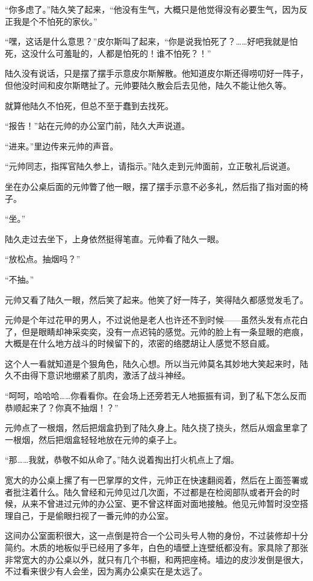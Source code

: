 “你多虑了。”陆久笑了起来，“他没有生气，大概只是他觉得没有必要生气，因为反正我是个不怕死的家伙。”

“嘿，这话是什么意思？”皮尔斯叫了起来，“你是说我怕死了？……好吧我就是怕死，这没什么可羞耻的，人都是怕死的！谁不怕死？！”

陆久没有说话，只是摆了摆手示意皮尔斯解散。他知道皮尔斯还得唠叨好一阵子，但他没时间和皮尔斯瞎扯了。元帅要陆久散会后去见他，陆久不能让他久等。

就算他陆久不怕死，但总不至于蠢到去找死。

“报告！”站在元帅的办公室门前，陆久大声说道。

“进来。”里边传来元帅的声音。

“元帅同志，指挥官陆久参上，请指示。”陆久走到元帅面前，立正敬礼后说道。

坐在办公桌后面的元帅瞥了他一眼，摆了摆手示意不必多礼，然后指了指对面的椅子。

“坐。”

陆久走过去坐下，上身依然挺得笔直。元帅看了陆久一眼。

“放松点。抽烟吗？”

“不抽。”

元帅又看了陆久一眼，然后笑了起来。他笑了好一阵子，笑得陆久都感觉发毛了。

元帅是个年过花甲的男人，不过说他是老人也许还不到时候——虽然头发有点花白了，但是眼睛却神采奕奕，没有一点迟钝的感觉。元帅的脸上有一条显眼的疤痕，大概是在什么地方战斗的时候留下的，浓密的络腮胡让人感觉不怒自威。

这个人一看就知道是个狠角色，陆久心想。所以当元帅莫名其妙地大笑起来时，陆久不由得下意识地绷紧了肌肉，激活了战斗神经。

“呵呵，哈哈哈……你看看你。在会场上还旁若无人地振振有词，到了私下怎么反而恭顺起来了？你真不抽烟！？”

元帅点了一根烟，然后把烟盒扔到了陆久身上。陆久挠了挠头，然后从烟盒里拿了一根烟，然后把烟盒轻轻地放在元帅的桌子上。

“那……我就，恭敬不如从命了。”陆久说着掏出打火机点上了烟。

宽大的办公桌上摞了有一巴掌厚的文件，元帅正在快速翻阅着，然后在上面签署或者批注着什么。陆久曾经和元帅见过几次面，不过都是在检阅部队或者开会的时候，从来不曾进过元帅的办公室、更不曾这样面对面地接触。他见元帅暂时没空搭理自己，于是偷眼扫视了一番元帅的办公室。

这间办公室面积很大，这一点倒是符合一个公司头号人物的身份，不过装修却十分简约。木质的地板似乎已经用了多年，白色的墙壁上连壁纸都没有。家具除了那张非常宽大的办公桌以外，就只有几个书橱，和两把座椅。墙边的皮沙发倒是很大，不过看来很少有人会坐，因为离办公桌实在是太远了。

